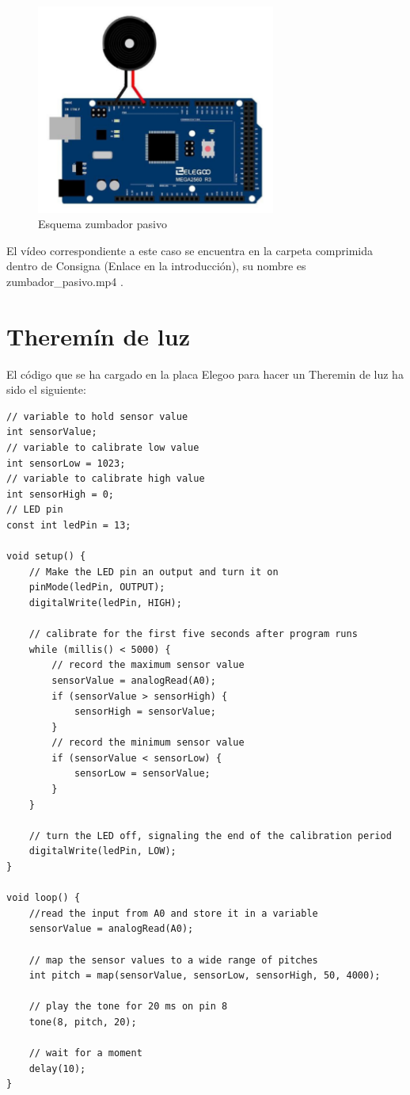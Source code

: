 	\begin{figure}[htb]
		\centering
		\includegraphics[width=0.7\textwidth]{./imagenes/3}
		\caption{Esquema zumbador pasivo} \label{fig:1}
	\end{figure}
	
	El vídeo correspondiente a este caso se encuentra en la carpeta comprimida dentro de Consigna (Enlace en la introducción),
	su nombre es zumbador\_pasivo.mp4 . 
	
	\section[Theremín de luz]{Theremín de luz}
	
	El código que se ha cargado en la placa Elegoo para hacer un Theremin de luz ha sido el siguiente: 
	
	\lstset{language=C}
	\begin{lstlisting}[frame=single]
// variable to hold sensor value
int sensorValue;
// variable to calibrate low value
int sensorLow = 1023;
// variable to calibrate high value
int sensorHigh = 0;
// LED pin
const int ledPin = 13;

void setup() {
	// Make the LED pin an output and turn it on
	pinMode(ledPin, OUTPUT);
	digitalWrite(ledPin, HIGH);

	// calibrate for the first five seconds after program runs
	while (millis() < 5000) {
		// record the maximum sensor value
		sensorValue = analogRead(A0);
		if (sensorValue > sensorHigh) {
			sensorHigh = sensorValue;
		}
		// record the minimum sensor value
		if (sensorValue < sensorLow) {
			sensorLow = sensorValue;
		}
	}

	// turn the LED off, signaling the end of the calibration period
	digitalWrite(ledPin, LOW);
}

void loop() {
	//read the input from A0 and store it in a variable
	sensorValue = analogRead(A0);

	// map the sensor values to a wide range of pitches
	int pitch = map(sensorValue, sensorLow, sensorHigh, 50, 4000);

	// play the tone for 20 ms on pin 8
	tone(8, pitch, 20);

	// wait for a moment
	delay(10);
}	
	\end{lstlisting}
	
